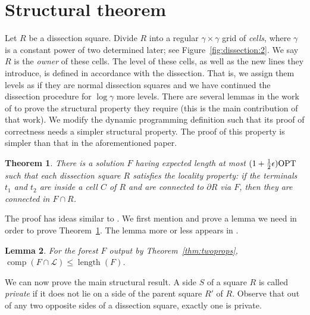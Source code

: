 \documentclass[extras,11pt]{article} \usepackage{fullpage}
\theoremstyle{mytheorem}
\newtheorem{theorem}{Theorem}
\newtheorem{lemma}[theorem]{Lemma}
\DeclareMathOperator{\len}{length}
\DeclareMathOperator{\comp}{comp}
\newcommand{\eL}{\mathcal{L}}
\newcommand{\OPT}{\mbox{\rm OPT}}
\begin{document}
\section{Structural theorem}\label{sec:struct}
Let $R$ be a dissection square.
Divide $R$ into a regular $\gamma\times\gamma$ grid of \emph{cells}, where $\gamma$ is a constant power of two determined later; see Figure~\ref{fig:dissection:2}.
We say $R$ is the \emph{owner} of these cells.
The level of these cells, as well as the new lines they introduce, is defined in accordance with the dissection.
That is, we assign them levels as if they are normal dissection squares and we have continued the dissection procedure for $\log\gamma$ more levels.
There are several lemmas in the work of \cite{BKM08:euc-for} to prove the structural property they require (this is the main contribution of that work).
We modify the dynamic programming definition such that its proof of correctness needs a simpler structural property.
The proof of this property is simpler than that in the aforementioned paper.
\begin{theorem}\label{thm:locality}
There is a solution $F$ having expected length at most $(1+\frac{1}{2}\epsilon)\OPT$ such that each dissection square $R$ satisfies the \emph{locality property}:
if the terminals $t_1$ and $t_2$ are inside a cell $C$ of $R$ and are connected to $\partial R$ via $F$,
 then they are connected in $F\cap R$.
\end{theorem}
The proof has ideas similar to \cite[Theorem 3.2, and Lemmas 3.3, 3.4, 3.5 and 3.9]{BKM08:euc-for}.  We first mention and prove a lemma we need in order to prove Theorem~\ref{thm:locality}.
The lemma more or less appears in \cite{arora98:ptas,BKM08:euc-for}.
\begin{lemma}\label{lem:tot-int}
For the forest $F$ output by Theorem~\ref{thm:twoprops},
$\comp(F\cap\eL)\leq \len(F)$.
\end{lemma}




We can now prove the main structural result.
A side $S$ of a square $R$ is called \emph{private} if it does not lie on a side of the parent square $R'$ of $R$.
Observe that out of any two opposite sides of a dissection square, exactly one is private.
\end{document}
